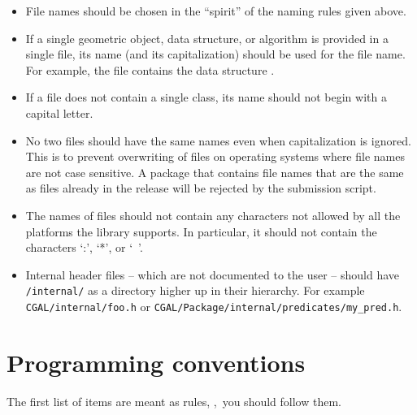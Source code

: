 \begin{itemize}
\item File names should be chosen in the ``spirit'' of the naming rules given
      above.
\item If a single geometric object, data structure, or algorithm is provided
      in a single file, its name (and its capitalization) should be used for
      the file name. For
      example, the file  contains the data structure
      .
\item If a file does not contain a single class, its name should not begin
      with a capital letter.
\item No two files should have the same names even when capitalization is
      ignored.  This is to prevent overwriting of files on operating systems
      where file names are not case sensitive.  A package that contains
      file names that are the same as files already in the release will be
      rejected by the submission script.
\item The names of files should not contain any characters not allowed by
      all the platforms the library supports.  In particular, it should not
      contain the characters `:', `*', or `\ '.
\item Internal header files -- which are not documented to the user -- should
      have {\tt /internal/} as a directory higher up in their hierarchy.
      For example {\tt CGAL/internal/foo.h} or
      {\tt CGAL/Package/internal/predicates/my\_pred.h}.
\end{itemize}


\section{Programming conventions\label{sec:programming_conventions}}

The first list of items are meant as rules, \ie,~you should follow them.

